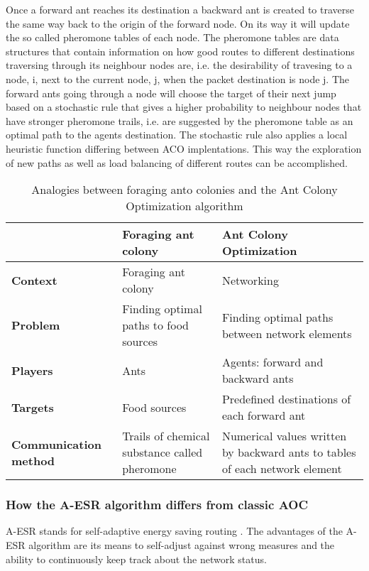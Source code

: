 \documentclass{IWORK2014}
\begin{document}
Once a forward ant reaches its destination a backward ant is created to traverse the same way back to the origin of the forward node. On its way it will update the so called pheromone tables of each node. The pheromone tables are data structures that contain information on how good routes to different destinations traversing through its neighbour nodes are, i.e. the desirability of travesing to a node, i, next to the current node, j, when the packet destination is node j. The forward ants going through a node will choose the target of their next jump based on a stochastic rule that gives a higher probability to neighbour nodes that have stronger pheromone trails, i.e. are suggested by the pheromone table as an optimal path to the agents destination. The stochastic rule also applies a local heuristic function differing between ACO implentations. This way the exploration of new paths as well as load balancing of different routes can be accomplished.

\begin{table}
	\begin{tabularx}{\linewidth}{|X|X|X|}
		\hline & \textbf{Foraging ant colony} & \textbf{Ant Colony Optimization} \\ \hline
		\textbf{Context} & Foraging ant colony & Networking \\ \hline
		\textbf{Problem} & Finding optimal paths to food sources & Finding optimal paths between network elements \\ \hline
		\textbf{Players} & Ants & Agents: forward and backward ants \\ \hline
		\textbf{Targets} & Food sources & Predefined destinations of each forward ant \\ \hline
		\textbf{Communication method} & Trails of chemical substance called pheromone & Numerical values written by backward ants to tables of each network element \\ \hline
	\end{tabularx}
	\caption{Analogies between foraging anto colonies and the Ant Colony Optimization algorithm}
	\label{tbl:analogies_ant}
\end{table}

\subsubsection{How the A-ESR algorithm differs from classic AOC}

A-ESR stands for self-adaptive energy saving routing \cite{kim2012ant}. The advantages of the A-ESR algorithm are its means to self-adjust against wrong measures and the ability to continuously keep track about the network status.
\end{document}
